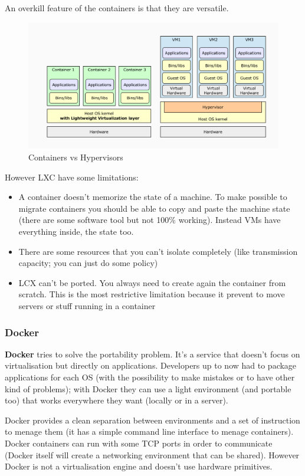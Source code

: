 An overkill feature of the containers is that they are versatile.
\begin{figure}[h!]
    \centering
    \includegraphics[scale=0.25]{images/contvshyp.png}
    \caption{Containers vs Hypervisors}
    \label{fig:cvs}
\end{figure}

However LXC have some limitations:
\begin{itemize}
    \item A container doesn't memorize the state of a machine. To make possible to migrate containers you should be able to copy and paste the machine state (there are some software tool but not 100\% working). Instead VMs have everything inside, the state too.
    \item There are some resources that you can't isolate completely (like transmission capacity; you can just do some policy)
    \item LCX can't be ported. You always need to create again the container from scratch. This is the most restrictive limitation because it prevent to move servers or stuff running in a container
\end{itemize}

\subsubsection{Docker}
\textbf{Docker} tries to solve the portability problem. It's a service that doesn't focus on virtualisation but directly on applications. Developers up to now had to package applications for each OS (with the possibility to make mistakes or to have other kind of problems); with Docker they can use a light environment (and portable too) that works everywhere they want (locally or in a server).

Docker provides a clean separation between environments and a set of instruction to menage them (it has a simple command line interface to menage containers). Docker containers can run with some TCP ports in order to communicate (Docker itself will create a networking environment that can be shared). However Docker is not a virtualisation engine and doesn't use hardware primitives.

